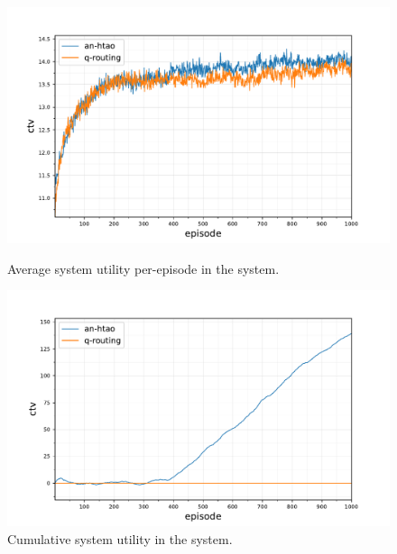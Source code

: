 \begin{figure}[ht]
	\begin{minipage}{.49\textwidth}
		\centering
		\includegraphics[width=1.0\linewidth,trim={25pt 0pt 50pt 0pt},clip]{520balanced_statistics-optimal-ctv}
		\captionsetup{labelfont=bf,singlelinecheck=on}
		\caption{Average system utility per-episode in the \newline \simulationSimple{}{} system.}
		\label{fig:simple_ctv}
	\end{minipage}
	\begin{minipage}{.49\textwidth}
		\centering
		\includegraphics[width=1.0\linewidth,trim={25pt 0pt 50pt 0pt},clip]{520comparison_statistics-optimal-ctv-comparison-cumulative}
		\captionsetup{labelfont=bf,singlelinecheck=on}
		\caption{Cumulative system utility in the \simulationSimple{}{} system.}
		\label{fig:simple_cumulative_ctv}
	\end{minipage}\hfill%
\end{figure}

